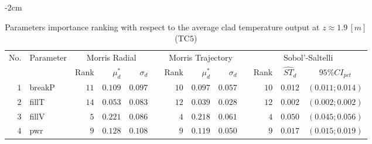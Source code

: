 \begin{table*}[!htbp]\centering
{}
\begin{adjustwidth*}{}{-2cm}
\caption{Parameters importance ranking with respect to the average clad temperature output at $z \approx 1.9 \, [m]$ (TC$5$)}
\label{tab:app_screening_tc5_average}
\begin{tabular}{@{}rlrrrrrrrrrcc@{}}\toprule
\multirow{2}{*}{\footnotesize{No.}} & \multirow{2}{*}{\footnotesize{Parameter}} & \multicolumn{3}{c}{\footnotesize{Morris Radial}} & \phantom{a} & \multicolumn{3}{c}{\footnotesize{Morris Trajectory}}  &\phantom{a}& \multicolumn{3}{c}{\footnotesize{Sobol'-Saltelli}}                               \\             
                                                                                  \cmidrule{3-5}                                                   \cmidrule{7-9}                                                      \cmidrule{11-13}
                                    &                                           & \footnotesize{Rank}   & $\mu^*_d$ & $\sigma_d$   &             & \footnotesize{Rank} & $\mu^*_d$ & $\sigma_d$          &           & \footnotesize{Rank} & \footnotesize{$\hat{ST}_d$} & \footnotesize{$95\%CI_{pct}$}\\ \midrule
\footnotesize{$1 $} & \footnotesize{breakP   } & \footnotesize{$11$} & \footnotesize{$0.109$} & \footnotesize{$0.097$} && \footnotesize{$10$} & \footnotesize{$0.097$} & \footnotesize{$0.057$} && \footnotesize{$10$} & \footnotesize{$0.012$} & \footnotesize{$(0.011;0.014)$} \\
\footnotesize{$2 $} & \footnotesize{fillT    } & \footnotesize{$14$} & \footnotesize{$0.053$} & \footnotesize{$0.083$} && \footnotesize{$12$} & \footnotesize{$0.039$} & \footnotesize{$0.028$} && \footnotesize{$12$} & \footnotesize{$0.002$} & \footnotesize{$(0.002;0.002)$} \\
\footnotesize{$3 $} & \footnotesize{fillV    } & \footnotesize{$5 $} & \footnotesize{$0.221$} & \footnotesize{$0.086$} && \footnotesize{$4 $} & \footnotesize{$0.218$} & \footnotesize{$0.061$} && \footnotesize{$4 $} & \footnotesize{$0.050$} & \footnotesize{$(0.045;0.056)$} \\
\footnotesize{$4 $} & \footnotesize{pwr      } & \footnotesize{$9 $} & \footnotesize{$0.128$} & \footnotesize{$0.108$} && \footnotesize{$9 $} & \footnotesize{$0.119$} & \footnotesize{$0.050$} && \footnotesize{$9 $} & \footnotesize{$0.017$} & \footnotesize{$(0.015;0.019)$} \\

\end{tabular}
\end{adjustwidth*}
\end{table*}
